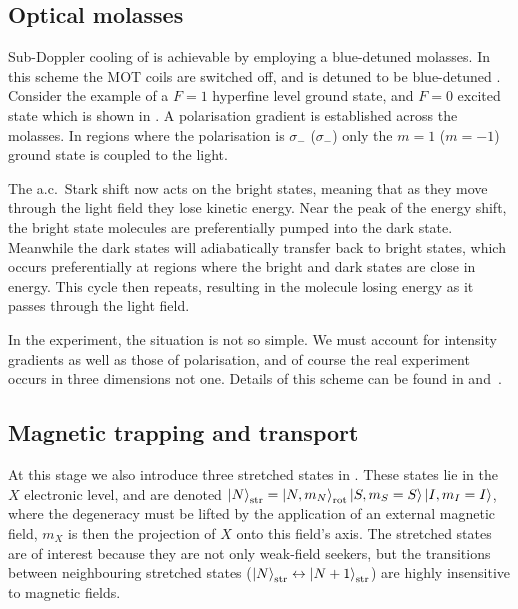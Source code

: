 \subsection*{Optical molasses}

Sub-Doppler cooling of \CaF{} is achievable by employing a blue-detuned
molasses. In this scheme the MOT coils are switched off, and 
is detuned to be blue-detuned .  Consider the example of a
$F=1$ hyperfine level ground state, and $F=0$ excited state which is shown in
. A polarisation gradient is established across the
molasses. In regions where the polarisation is $\sigma_-$ ($\sigma_-$) only the
$m=1$ ($m=-1$) ground state is coupled to the light.

The a.c.\ Stark shift now acts on the bright states, meaning that as they move
through the light field they lose kinetic energy. Near the peak of the energy
shift, the bright state molecules are preferentially pumped into the dark
state. Meanwhile the dark states will adiabatically transfer back to bright
states, which occurs preferentially at regions where the bright and dark states
are close in energy. This cycle then repeats, resulting in the molecule losing
energy as it passes through the light field.


In the \CaF{} experiment, the situation is not so simple. We must account for
intensity gradients as well as those of polarisation, and of course the real
experiment occurs in three dimensions not one. Details of this scheme can be
found in  and~\cite{Truppe2017}.

\subsection*{Magnetic trapping and transport}


At this stage we also introduce three stretched states in \CaF{}. These states
lie in the $X$ electronic level, and are denoted $\ket{N}_\text{str} = \ket{N,
m_N}_\text{rot}\ket{S, m_S=S}\ket{I,m_I=I}$, where the degeneracy must be
lifted by the application of an external magnetic field, $m_X$ is then the
projection of $X$ onto this field's axis. The stretched states are of interest
because they are not only weak-field seekers, but the transitions between
neighbouring stretched states
($\ket{N}_\text{str}\leftrightarrow\ket{N+1}_\text{str}$) are highly
insensitive to magnetic fields.


